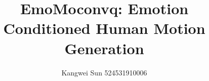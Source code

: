 \documentclass[conference]{IEEEtran}
\begin{document}
\title{EmoMoconvq: Emotion Conditioned Human Motion Generation}

\author{Kangwei Sun 524531910006}





% 


\maketitle
\end{document}
